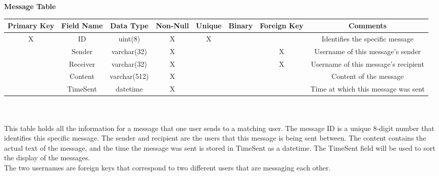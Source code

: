 \documentclass{article}
\begin{document}
\begin{enumerate}
        \textbf{Message Table}\\
        \begin{adjustbox}{width=1.2\textwidth}
            \begin{tabular}{|c|c|c|c|c|c|c|c|}
                \hline
                Primary Key & Field Name & Data Type & Non-Null & Unique & Binary & Foreign Key & Comments \\ \hline
                X & ID & uint(8) & X & X &  &  & Identifies the specific message\\ \hline
                 & Sender & varchar(32) & X &  &  & X & Username of this message's sender\\ \hline
                 & Receiver & varchar(32) & X &  &  & X & Username of this message's recipient\\ \hline
                 & Content & varchar(512) & X &  &  &  & Content of the message\\ \hline
                 & TimeSent & datetime & X &  &  &  & Time at which this message was sent\\ \hline
            \end{tabular}
        \end{adjustbox}\\\\
        This table holds all the information for a message that one user sends to a matching user. The message ID is a unique 8-digit number that identifies this specific message. The sender and recipient are the users that this message is being sent between. The content contains the actual text of the message, and the time the message was sent is stored in TimeSent as a datetime. The TimeSent field will be used to sort the display of the messages.\\
        The two usernames are foreign keys that correspond to two different users that are messaging each other.\\
    \end{enumerate}
\end{document}
